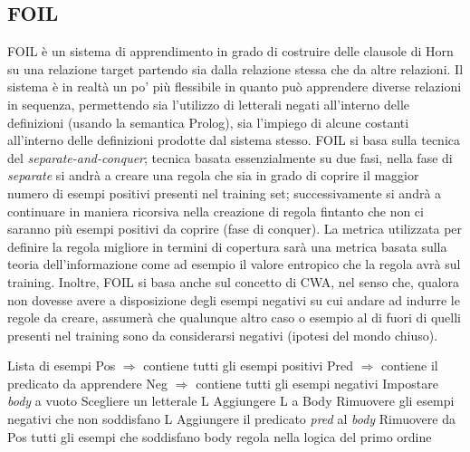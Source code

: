 \subsection{FOIL}
\nocite{Quinlan:1993:FMR:645323.649599}
FOIL è un sistema di apprendimento in grado di costruire delle clausole di Horn su una relazione target partendo sia dalla relazione stessa che da altre relazioni. Il sistema è in realtà un po' più flessibile in quanto può apprendere diverse relazioni in sequenza, permettendo sia l'utilizzo di letterali negati all'interno delle definizioni (usando la semantica Prolog), sia l'impiego di alcune costanti all'interno delle definizioni prodotte dal sistema stesso.
FOIL si basa sulla tecnica del \textit{separate-and-conquer}; tecnica basata essenzialmente su due fasi, nella fase di \textit{separate} si andrà a creare una regola che sia in grado di coprire il maggior numero di esempi positivi presenti nel training set; successivamente si andrà a continuare in maniera ricorsiva nella creazione di regola fintanto che non ci saranno più esempi positivi da coprire (fase di conquer).
La metrica utilizzata per definire la regola migliore in termini di copertura sarà una metrica basata sulla teoria dell'informazione come ad esempio il valore entropico che la regola avrà sul training.
Inoltre, FOIL si basa anche sul concetto di CWA, nel senso che, qualora non dovesse avere a disposizione degli esempi negativi su cui andare ad indurre le regole da creare, assumerà che qualunque altro caso o esempio al di fuori di quelli presenti nel training sono da considerarsi negativi (ipotesi del mondo chiuso).
\begin{algorithm}
	\begin{algorithmic}
	\REQUIRE Lista di esempi
	\STATE Pos $\Rightarrow$ contiene tutti gli esempi positivi
	\STATE Pred $\Rightarrow$ contiene il predicato da apprendere
	\STATE Neg $\Rightarrow$ contiene tutti gli esempi negativi
	\STATE Impostare \textit{body} a vuoto
	\STATE Scegliere un letterale L
	\STATE Aggiungere L a Body
	\STATE Rimuovere gli esempi negativi che non soddisfano L
	\ENDWHILE
	\STATE Aggiungere il predicato \textit{pred} al \textit{body}
	\STATE Rimuovere da Pos tutti gli esempi che soddisfano body
	\ENDWHILE
	\ENDFOR
	\RETURN regola nella logica del primo ordine
	\end{algorithmic}
\end{algorithm}